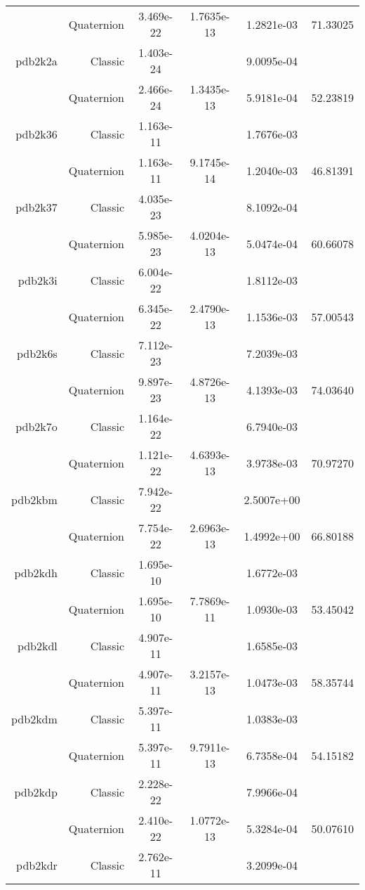 \begin{xltabular}{\textwidth}{r|rS[table-format=1.3e+2]S[table-format=1.4e+2]S[table-format=1.4e+2]S[table-format=-1.5]}
& Quaternion & 3.469e-22 & 1.7635e-13 & 1.2821e-03 & 71.33025\\  \addlinespace
pdb2k2a & Classic & 1.403e-24 &  & 9.0095e-04 & \\
& Quaternion & 2.466e-24 & 1.3435e-13 & 5.9181e-04 & 52.23819\\  \addlinespace
pdb2k36 & Classic & 1.163e-11 &  & 1.7676e-03 & \\
& Quaternion & 1.163e-11 & 9.1745e-14 & 1.2040e-03 & 46.81391\\  \addlinespace
pdb2k37 & Classic & 4.035e-23 &  & 8.1092e-04 & \\
& Quaternion & 5.985e-23 & 4.0204e-13 & 5.0474e-04 & 60.66078\\  \addlinespace
pdb2k3i & Classic & 6.004e-22 &  & 1.8112e-03 & \\
& Quaternion & 6.345e-22 & 2.4790e-13 & 1.1536e-03 & 57.00543\\  \addlinespace
pdb2k6s & Classic & 7.112e-23 &  & 7.2039e-03 & \\
& Quaternion & 9.897e-23 & 4.8726e-13 & 4.1393e-03 & 74.03640\\  \addlinespace
pdb2k7o & Classic & 1.164e-22 &  & 6.7940e-03 & \\
& Quaternion & 1.121e-22 & 4.6393e-13 & 3.9738e-03 & 70.97270\\  \addlinespace
pdb2kbm & Classic & 7.942e-22 &  & 2.5007e+00 & \\
& Quaternion & 7.754e-22 & 2.6963e-13 & 1.4992e+00 & 66.80188\\  \addlinespace
pdb2kdh & Classic & 1.695e-10 &  & 1.6772e-03 & \\
& Quaternion & 1.695e-10 & 7.7869e-11 & 1.0930e-03 & 53.45042\\  \addlinespace
pdb2kdl & Classic & 4.907e-11 &  & 1.6585e-03 & \\
& Quaternion & 4.907e-11 & 3.2157e-13 & 1.0473e-03 & 58.35744\\  \addlinespace
pdb2kdm & Classic & 5.397e-11 &  & 1.0383e-03 & \\
& Quaternion & 5.397e-11 & 9.7911e-13 & 6.7358e-04 & 54.15182\\  \addlinespace
pdb2kdp & Classic & 2.228e-22 &  & 7.9966e-04 & \\
& Quaternion & 2.410e-22 & 1.0772e-13 & 5.3284e-04 & 50.07610\\  \addlinespace
pdb2kdr & Classic & 2.762e-11 &  & 3.2099e-04 & \\

\end{xltabular}
